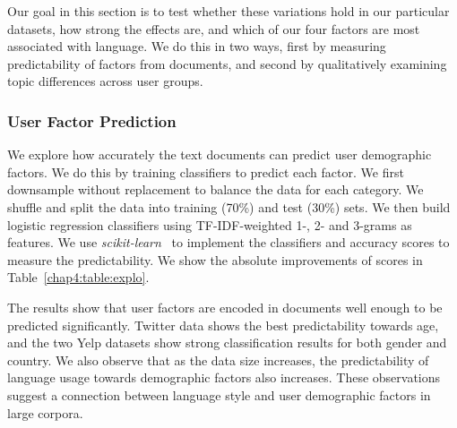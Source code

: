 Our goal in this section is to test
whether these variations hold in our particular datasets,
how strong the effects are,
and which of our four factors are most associated with language.
We do this in two ways,
first by measuring predictability of factors from documents,
and second by qualitatively examining topic differences across user groups.


\begin{table}[t]
\centering
{}
\caption{Predictability of user factors from language data. We show the absolute percentage of improvements in accuracy over majority-class baselines. For example, the majority-class baselines of accuracy scores are either .500 for the binary prediction or .250 for the region prediction.}
\label{chap4:table:explo}
\end{table}

\subsubsection{User Factor Prediction}

We explore how accurately the text documents can predict user demographic factors. 
We do this by training classifiers to predict each factor.
We first downsample without replacement to balance the data for each category. We shuffle and split the data into training (70\%) and test (30\%) sets. 
We then build logistic regression classifiers using TF-IDF-weighted 1-, 2- and 3-grams as features. 
We use \textit{scikit-learn}~\cite{pedregosa2011scikit} to implement the classifiers and accuracy scores to measure the predictability.
We show the absolute improvements of scores in Table~\ref{chap4:table:explo}. 

The results show that user factors are encoded in documents well enough to be predicted significantly.
Twitter data shows the best predictability towards age, and the two Yelp datasets show strong classification results for both gender and country. We also observe that as the data size increases, the predictability of language usage towards demographic factors also increases. These observations suggest a connection between language style and user demographic factors in large corpora.


